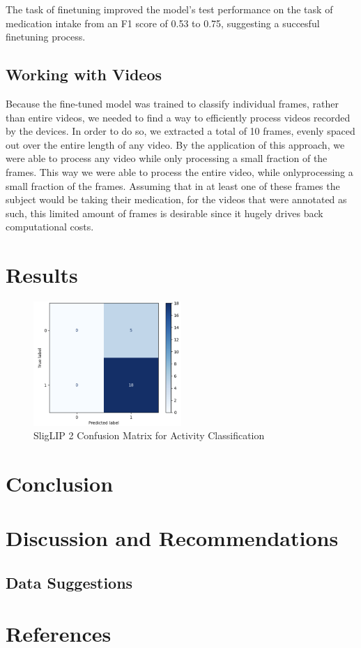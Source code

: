 \documentclass[a4paper,12pt]{article}
\begin{document}
The task of finetuning improved the model's test performance on the task of medication intake from
an F1 score of 0.53 to 0.75, suggesting a succesful finetuning process. 




\subsection{Working with Videos}
Because the fine-tuned model was trained to classify individual frames, rather than
entire videos, we needed to find a way to efficiently process videos recorded by the
devices. In order to do so, we extracted a total of 10 frames, evenly spaced out over the
entire length of any video. By the application of this approach, we were able to 
process any video while only processing a small fraction of the frames. 
This way we were able to process the entire video, while onlyprocessing a small 
fraction of the frames. Assuming that in at least one of these frames the subject 
would be taking their medication, for the videos that were annotated as such, 
this limited amount of frames is desirable since it hugely drives back computational costs. 


\section{Results}
\begin{figure}[H]
    \centering
    \includegraphics[width=0.5\textwidth]{./images/test confusion matrix.png} %
    \caption{SligLIP 2 Confusion Matrix for Activity Classification}
    \label{fig:test-cm}
\end{figure}


\section{Conclusion}

\section{Discussion and Recommendations}
\subsection{Data Suggestions}

\section*{References}
\end{document}
